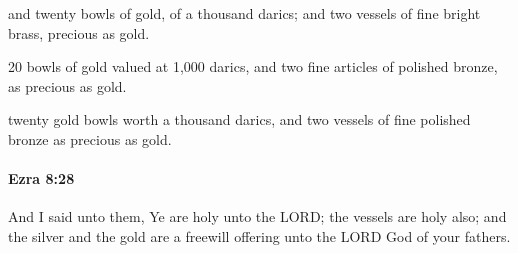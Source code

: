 			\begin{versebox}
					\item[BHS] 
					\item[LXX] 
					\item[ASV] and twenty bowls of gold, of a thousand darics; and two vessels of fine bright brass, precious as gold.
					\item[NIV] 20 bowls of gold valued at 1,000 darics, and two fine articles of polished bronze, as precious as gold.
					\item[NRSV] twenty gold bowls worth a thousand darics, and two vessels of fine polished bronze as precious as gold.
			\end{versebox}

		\paragraph{Ezra 8:28} %
			\label{EZRA-8-28}

			And I said unto them, Ye are holy unto the LORD; the vessels are holy also; and the silver and the gold are a freewill offering unto the LORD God of your fathers.

